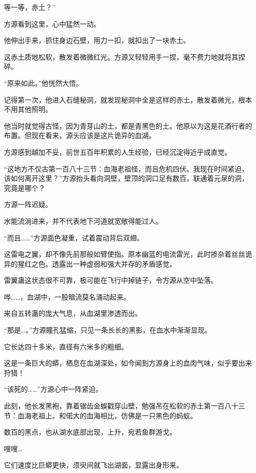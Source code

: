 
\begin{this_body}

等一等，赤土？”

方源看到这里，心中猛然一动。

他伸出手来，抓住身边石壁，用力一扣，就扣出了一块赤土。

这赤土质地松软，散发着微微红光。方源又轻轻用手一捏，毫不费力地就将其捏碎。

“原来如此。”他恍然大悟。

记得第一次，他进入石缝秘洞，就发现秘洞中全是这样的赤土，散发着微光，根本不用其他照明。

他当时就觉得古怪，因为青芽山的土，都是青黑色的土。他原以为这是花酒行者的布置。但现在看来，源头应该是这片诡异的血湖。

方源感到越加不妥，前世五百年积累的人生经验，已经沉淀得近乎成直觉。

“这地方不仅古第一百八十三节：血海老祖怪，而且危机四伏。我现在时间紧迫，该如何离开这里？”方源抬头看向洞壁，壁顶的洞口足有数百，联通着元泉的洞，究竟是哪个？

方源一阵迟疑。

水能流淌进来，并不代表地下河道就宽敞得能过人。

“而且……”方源面色凝重，试着震动背后双翅。

这雷电之翼，却不像先前那般如臂使指。原本幽蓝的电流雷光，此时掺杂着丝丝诡异的猩红之色。透露出一种虚弱和强大并存的矛盾感觉。

雷翼蛊这状态很不可靠，极可能在飞行中掉链子，令方源从空中坠落。

哗……，血湖中，一股暗流莫名涌动起来。

来自五转蛊的庞大气息，从血湖里渗透而出。

“那是…。”方源瞳孔猛缩，只见一条长长的黑影，在血水中渐渐显现。

它长达四十多米，直径有六米多的粗细。

这是一条巨大的蟒，栖息在血湖深处，如今闻到方源身上的血肉气味，似乎要出来狩猎！

“该死的……”方源心中一阵紧迫。

此刻，他长发黑袍，靠着锯齿金蜈戳穿山壁，勉强吊在松软的赤土第一百八十三节：血海老祖上。和偌大的血海相比，仿佛是一只黑色的蚂蚁。

数百的黑点，也从湖水底部出现，上升，宛若鱼群游戈。

嗖嗖…

它们速度比巨蟒更快，须臾间就飞出湖面，显露出身形来。


\end{this_body}
